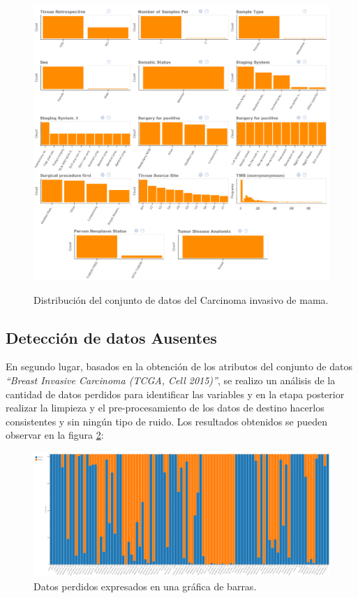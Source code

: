 \begin{figure}
	\centering
	\includegraphics[width=1
	\linewidth]{NOTEBOOK/IMAGES_EDA/5}
	\label{EDA}
	\caption{Distribución del conjunto de datos del Carcinoma invasivo de mama.}\label{fig:foobar}
\end{figure}


\subsection{Detección de datos Ausentes}
En segundo lugar, basados en la obtención de los atributos del conjunto de datos \textit{“Breast Invasive Carcinoma (TCGA, Cell 2015)”}, se realizo un análisis de la cantidad de datos perdidos para identificar las variables y en la etapa posterior realizar la limpieza y el pre-procesamiento de los datos de destino hacerlos consistentes y sin ningún tipo de ruido. Los resultados obtenidos se pueden observar en la figura \ref{Missing_Bar_Chart}:


\begin{figure}[!htb]
	\centering
	\includegraphics[width=1\linewidth]{IMAGENES/Missing_Bar_Chart}
	\caption{Datos perdidos expresados en una gráfica de barras.}
	\label{Missing_Bar_Chart}
\end{figure}

